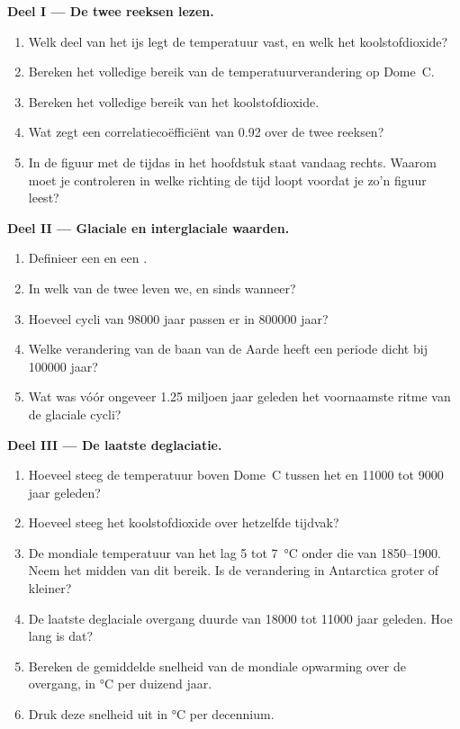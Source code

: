 \begin{problem}
\medskip
\noindent\textbf{Deel I --- De twee reeksen lezen.}
\begin{enumerate}
  \item Welk deel van het ijs legt de temperatuur vast, en welk het
        koolstofdioxide?
  \item Bereken het volledige bereik van de temperatuurverandering op Dome~C.
  \item Bereken het volledige bereik van het koolstofdioxide.
  \item Wat zegt een correlatiecoëfficiënt van 0.92 over de twee
        reeksen?
  \item In de figuur met de tijdas in het hoofdstuk staat vandaag rechts. Waarom
        moet je controleren in welke richting de tijd loopt voordat je zo'n figuur leest?
\end{enumerate}

\medskip
\noindent\textbf{Deel II --- Glaciale en interglaciale waarden.}
\begin{enumerate}[resume]
  \item Definieer een  en een .
  \item In welk van de twee leven we, en sinds wanneer?
  \item Hoeveel cycli van \num{98000} jaar passen er in \num{800000} jaar?
  \item Welke verandering van de baan van de Aarde heeft een periode dicht bij
        \num{100000} jaar?
  \item Wat was vóór ongeveer 1.25 miljoen jaar geleden het voornaamste ritme van
        de glaciale cycli?
\end{enumerate}

\medskip
\noindent\textbf{Deel III --- De laatste deglaciatie.}
\begin{enumerate}[resume]
  \item Hoeveel steeg de temperatuur boven Dome~C tussen het  en \num{11000} tot \num{9000} jaar geleden?
  \item Hoeveel steeg het koolstofdioxide over hetzelfde tijdvak?
  \item De mondiale temperatuur van het  lag 5 tot
        \qty{7}{\degreeCelsius} onder die van 1850--1900. Neem het midden van
        dit bereik. Is de verandering in Antarctica groter of kleiner?
  \item De laatste deglaciale overgang duurde van \num{18000} tot
        \num{11000} jaar geleden. Hoe lang is dat?
  \item Bereken de gemiddelde snelheid van de mondiale opwarming over de overgang, in
        \unit{\degreeCelsius} per duizend jaar.
  \item Druk deze snelheid uit in \unit{\degreeCelsius} per decennium.
\end{enumerate}


\end{problem}
